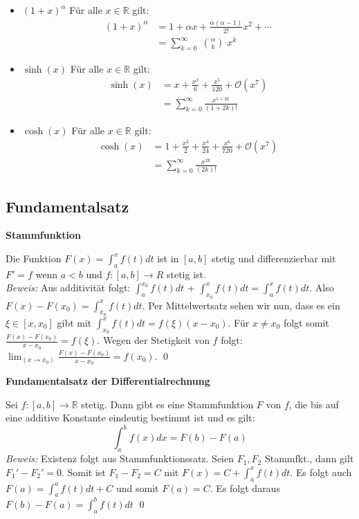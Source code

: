 \documentclass[25pt]{sciposter}
\newcommand{\R}{\mathbb{R}}
\newenvironment{method}[1]{\begin{mdframed}[backgroundcolor=blue!10,innertopmargin=15pt, innerbottommargin=15pt,nobreak=true]
		\textbf{#1 }
	}
	{ 
	\end{mdframed}
}
\begin{document}
\begin{multicols}{3}
\begin{itemize}
	\item $\boxed{(1 + x)^\alpha}$ Für alle $x\in \R$ gilt:
	\begin{align*}
	(1 + x)^\alpha &=  1 + \alpha x + \frac{\alpha(\alpha-1)}{2!} x^2 + \cdots \\
	 &= \sum_{k=0}^{\infty} \; {\alpha \choose k} \; x^k 
	\end{align*}
	
	\item $\boxed{\sinh(x)}$ Für alle $x\in \R$ gilt:
	\begin{align*}
	\sinh(x) &= x + \frac{x^3}{6} + \frac{x^5}{120} + \mathcal{O}(x^7)\\
	&= \sum_{k=0}^{\infty}\frac{x^{1+2k}}{(1+2k)!}
	\end{align*}
	
	\item $\boxed{\cosh(x)}$ Für alle $x\in \R$ gilt:
	\begin{align*}
	\cosh(x) &= 1 + \frac{x^2}{2} + \frac{x^4}{24} + \frac{x^6}{720} +  \mathcal{O}(x^7)\\
	&= \sum_{k=0}^{\infty}\frac{x^{2k}}{(2k)!}
	\end{align*}
	

\end{itemize}






\subsection*{Fundamentalsatz}
\begin{method}{Stammfunktion}
Die Funktion $F(x) = \int_{a}^{x} f(t) dt$ ist in $[a,b]$ stetig und differenzierbar mit $F' = f$ wenn $a<b$ und $f:[a,b]\to R$ stetig ist. \\
\textit{Beweis:} Aus additivität folgt: $\int_{a}^{x_0} f(t) dt$ + $\int_{x_0}^{x} f(t) dt = \int_{a}^{x} f(t) dt$. Also $F(x) - F(x_0) = \int_{x_0}^{x} f(t) dt$. Per Mittelwertsatz sehen wir nun, dass es ein $\xi \in [x,x_0]$ gibt mit $\int_{x_0}^{x} f(t) dt = f(\xi) (x-x_0) $. Für $x \not = x_0$ folgt somit $\frac{F(x) - F(x_0)}{x-x_0} = f(\xi)$. Wegen der Stetigkeit von $f$ folgt: $\lim_{(x\to x_0)} \frac{F(x) - F(x_0)}{x-x_0} = f(x_0)$. \qed
\end{method}


\begin{method}{Fundamentalsatz der Differentialrechnung}
Sei $f:[a,b] \to \R$ stetig. Dann gibt es eine Stammfunktion $F$ von $f$, die bis auf eine additive Konstante eindeutig bestimmt ist und es gilt:
$$\int_{a}^{b} f(x) dx = F(b) - F(a)$$
\textit{Beweis:} Existenz folgt aus Stammfunktionssatz. Seien $F_1, F_2$ Stammfkt., dann gilt $F_1' - F_2' = 0$. Somit ist $F_1 - F_2 = C$ mit $F(x) = C + \int_{a}^{x} f(t) dt$. Es folgt auch $F(a) = \int_{a}^{a} f(t) dt + C$ und somit $F(a) = C$. Es folgt daraus $F(b)-F(a) = \int_{a}^{b} f(t) dt$ \qed 
\end{method}



\end{multicols}
\end{document}
